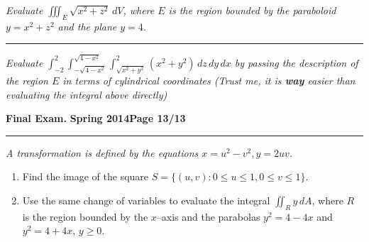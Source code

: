 \documentclass[12pt]{article}
\begin{document}
\bigskip
{\problem[10 pts] \em Evaluate $\iiint_E \sqrt{x^2+z^2}\, dV$, where
  $E$ is the region bounded by the paraboloid $y=x^2+z^2$ and the
  plane $y=4$.}
\vspace{8cm}
\begin{flushright}
\end{flushright}
\hrule
{\problem[15 pts] \em Evaluate $\int_{-2}^2
  \int_{-\sqrt{4-x^2}}^{\sqrt{4-x^2}} \int_{\sqrt{x^2+y^2}}^2
  (x^2+y^2)\, dz\, dy\, dx$ by passing the description of the region
  $E$ in terms of cylindrical coordinates (Trust me, it is
  \textbf{way} easier than evaluating the integral above directly)}
\vspace{8cm}
\begin{flushright}
\end{flushright}
\newpage

\hfill{\large\bf Final Exam.}\hfill{\large\bf
  Spring 2014}\hfill{\large\bf Page 13/13}\hrule

\bigskip
{\problem[20 pts] \em A transformation is defined by the equations
  $x=u^2-v^2, y=2uv$.}
\begin{enumerate}
\item Find the image of the square $S=\big\{ (u,v) : 0 \leq u \leq 1,
  0 \leq v \leq 1 \big\}$.
\item Use the same change of variables to evaluate the integral
  $\iint_R y\, dA$, where $R$ is the region bounded by the $x$--axis
  and the parabolas $y^2=4-4x$ and $y^2=4+4x$, $y\geq 0$.
\end{enumerate}
\vspace{14.5cm}
\begin{flushright}
\end{flushright}
\end{document}

